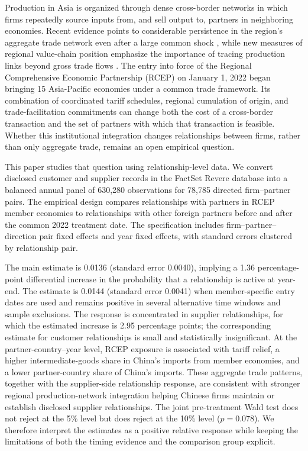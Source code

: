 \documentclass[preprint,12pt,authoryear]{elsarticle}
\begin{document}
Production in Asia is organized through dense cross-border networks in which firms repeatedly source inputs from, and sell output to, partners in neighboring economies. Recent evidence points to considerable persistence in the region's aggregate trade network even after a large common shock \citep{kiyota2022covid}, while new measures of regional value-chain position emphasize the importance of tracing production links beyond gross trade flows \citep{he2023regional}. The entry into force of the Regional Comprehensive Economic Partnership (RCEP) on January 1, 2022 began bringing 15 Asia-Pacific economies under a common trade framework. Its combination of coordinated tariff schedules, regional cumulation of origin, and trade-facilitation commitments can change both the cost of a cross-border transaction and the set of partners with which that transaction is feasible. Whether this institutional integration changes relationships between firms, rather than only aggregate trade, remains an open empirical question.

This paper studies that question using relationship-level data. We convert disclosed customer and supplier records in the FactSet Revere database into a balanced annual panel of 630,280 observations for 78,785 directed firm--partner pairs. The empirical design compares relationships with partners in RCEP member economies to relationships with other foreign partners before and after the common 2022 treatment date. The specification includes firm--partner--direction pair fixed effects and year fixed effects, with standard errors clustered by relationship pair.

The main estimate is 0.0136 (standard error 0.0040), implying a 1.36 percentage-point differential increase in the probability that a relationship is active at year-end. The estimate is 0.0144 (standard error 0.0041) when member-specific entry dates are used and remains positive in several alternative time windows and sample exclusions. The response is concentrated in supplier relationships, for which the estimated increase is 2.95 percentage points; the corresponding estimate for customer relationships is small and statistically insignificant. At the partner-country--year level, RCEP exposure is associated with tariff relief, a higher intermediate-goods share in China's imports from member economies, and a lower partner-country share of China's imports. These aggregate trade patterns, together with the supplier-side relationship response, are consistent with stronger regional production-network integration helping Chinese firms maintain or establish disclosed supplier relationships. The joint pre-treatment Wald test does not reject at the 5\% level but does reject at the 10\% level ($p=0.078$). We therefore interpret the estimates as a positive relative response while keeping the limitations of both the timing evidence and the comparison group explicit.
\end{document}
